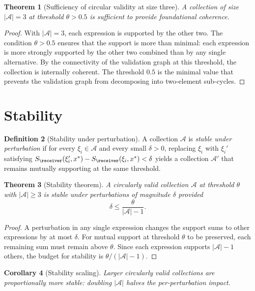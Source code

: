 \documentclass[11pt,a4paper]{article}
\theoremstyle{thmstyle}
\newtheorem{theorem}{Theorem}[section]
\newtheorem{corollary}[theorem]{Corollary}
\theoremstyle{thmstyle}
\theoremstyle{definition}
\newtheorem{definition}[theorem]{Definition}
\theoremstyle{remark}
\newcommand{\Ax}{\mathcal{A}}
\newcommand{\Sscalar}{S}
\begin{document}
\begin{theorem}[Sufficiency of circular validity at
size three]\label{thm:suff-circular-three}
A collection of size $|\Ax| = 3$ at threshold
$\theta > 0.5$ is sufficient to provide
foundational coherence.
\end{theorem}

\begin{proof}
With $|\Ax| = 3$, each expression is supported by
the other two.  The condition $\theta > 0.5$ ensures
that the support is more than minimal: each
expression is more strongly supported by the other
two combined than by any single alternative.  By
the connectivity of the validation graph at this
threshold, the collection is internally coherent.
The threshold $0.5$ is the minimal value that
prevents the validation graph from decomposing into
two-element sub-cycles.
\end{proof}

\section{Stability}
\label{sec:stability}

\begin{definition}[Stability under perturbation]
\label{def:stability}
A collection $\Ax$ is \emph{stable under perturbation}
if for every $\xi_{i} \in \Ax$ and every small
$\delta > 0$, replacing $\xi_{i}$ with $\xi_{i}'$
satisfying $\Sscalar_{\receiver}(\xi_{i}', x^{*}) -
\Sscalar_{\receiver}(\xi_{i}, x^{*}) < \delta$ yields
a collection $\Ax'$ that remains mutually supporting
at the same threshold.
\end{definition}

\begin{theorem}[Stability theorem]\label{thm:stability}
A circularly valid collection $\Ax$ at threshold
$\theta$ with $|\Ax| \geq 3$ is stable under
perturbations of magnitude $\delta$ provided
\[
\delta \leq \frac{\theta}{|\Ax| - 1}.
\]
\end{theorem}

\begin{proof}
A perturbation in any single expression changes the
support sums to other expressions by at most
$\delta$.  For mutual support at threshold $\theta$
to be preserved, each remaining sum must remain
above $\theta$.  Since each expression supports
$|\Ax| - 1$ others, the budget for stability is
$\theta / (|\Ax| - 1)$.
\end{proof}

\begin{corollary}[Stability scaling]\label{cor:stability-scaling}
Larger circularly valid collections are
proportionally more stable: doubling $|\Ax|$ halves
the per-perturbation impact.
\end{corollary}
\end{document}

